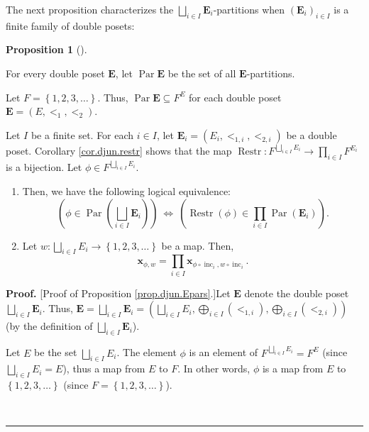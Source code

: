 \documentclass[numbers=enddot,12pt,final,onecolumn,notitlepage,abstracton]{scrartcl}
\theoremstyle{definition}
\newtheorem{prop}[theo]{Proposition}
\newenvironment{proposition}[1][]
{\begin{prop}[#1]\begin{leftbar}}
{\end{leftbar}\end{prop}}
\newenvironment{proof}[1][Proof]{\noindent\textbf{#1.} }{\ \rule{0.5em}{0.5em}}
\let\prodnonlimits\prod
\renewcommand{\prod}{\prodnonlimits\limits}
\newenvironment{verlong}{}{}
\begin{document}
\begin{verlong}
\begin{footnotesize}
The next proposition characterizes the $\bigsqcup_{i\in I}\mathbf{E}_{i}%
$-partitions when $\left(  \mathbf{E}_{i}\right)  _{i\in I}$ is a finite
family of double posets:

\begin{proposition}
\label{prop.djun.Epars}For every double poset $\mathbf{E}$, let
$\operatorname*{Par}\mathbf{E}$ be the set of all $\mathbf{E}$-partitions.

Let $F=\left\{  1,2,3,\ldots\right\}  $. Thus, $\operatorname*{Par}%
\mathbf{E}\subseteq F^{E}$ for each double poset $\mathbf{E}=\left(
E,<_{1},<_{2}\right)  $.

Let $I$ be a finite set. For each $i\in I$, let $\mathbf{E}_{i}=\left(
E_{i},<_{1,i},<_{2,i}\right)  $ be a double poset. Corollary
\ref{cor.djun.restr} shows that the map $\operatorname*{Restr}:F^{\bigsqcup
_{i\in I}E_{i}}\rightarrow\prod_{i\in I}F^{E_{i}}$ is a bijection. Let
$\phi\in F^{\bigsqcup_{i\in I}E_{i}}$.

\begin{enumerate}
\item[(a)] Then, we have the following logical equivalence:%
\[
\left(  \phi\in\operatorname*{Par}\left(  \bigsqcup_{i\in I}\mathbf{E}%
_{i}\right)  \right)  \ \Longleftrightarrow\ \left(  \operatorname*{Restr}%
\left(  \phi\right)  \in\prod_{i\in I}\operatorname*{Par}\left(
\mathbf{E}_{i}\right)  \right)  .
\]


\item[(b)] Let $w:\bigsqcup_{i\in I}E_{i}\rightarrow\left\{  1,2,3,\ldots
\right\}  $ be a map. Then,%
\[
\mathbf{x}_{\phi,w}=\prod_{i\in I}\mathbf{x}_{\phi\circ\operatorname*{inc}%
\nolimits_{i},w\circ\operatorname*{inc}\nolimits_{i}}.
\]

\end{enumerate}
\end{proposition}

\begin{proof}
[Proof of Proposition \ref{prop.djun.Epars}.]Let $\mathbf{E}$ denote the
double poset $\bigsqcup_{i\in I}\mathbf{E}_{i}$. Thus, \newline
$\mathbf{E}%
=\bigsqcup_{i\in I}\mathbf{E}_{i}=\left(  \bigsqcup_{i\in I}E_{i}%
,\bigoplus_{i\in I}\left(  <_{1,i}\right)  ,\bigoplus_{i\in I}\left(
<_{2,i}\right)  \right)  $ (by the definition of $\bigsqcup_{i\in I}%
\mathbf{E}_{i}$).

Let $E$ be the set $\bigsqcup_{i\in I}E_{i}$. The element $\phi$ is an element
of $F^{\bigsqcup_{i\in I}E_{i}}=F^{E}$ (since $\bigsqcup_{i\in I}E_{i}=E$),
thus a map from $E$ to $F$. In other words, $\phi$ is a map from $E$ to
$\left\{  1,2,3,\ldots\right\}  $ (since $F=\left\{  1,2,3,\ldots\right\}  $).


\end{proof}
\end{footnotesize}
\end{verlong}
\end{document}
